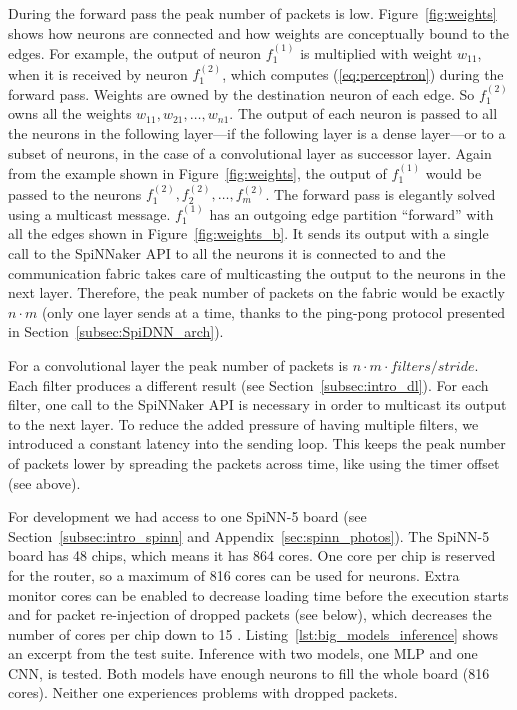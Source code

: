 \documentclass[]{article}
\begin{document}
During the forward pass the peak number of packets is low.
Figure~\ref{fig:weights} shows how neurons are connected and how
weights are conceptually bound to the edges.
For example, the output of neuron $f^{(1)}_1$ is multiplied with
weight $w_{11}$, when it is received by neuron $f^{(2)}_1$,
which computes (\ref{eq:perceptron}) during the forward pass.
Weights are owned by the destination neuron of each edge.
So $f^{(2)}_1$ owns all the weights $w_{11},w_{21},\dots,w_{n1}$.
The output of each neuron is passed to all the neurons in the
following layer---if the following layer is a dense layer---or to a
subset of neurons, in the case of a convolutional layer as successor
layer.
Again from the example shown in Figure~\ref{fig:weights}, the output
of $f^{(1)}_1$ would be passed to the neurons $f^{(2)}_1, f^{(2)}_2,
\dots, f^{(2)}_m$.
The forward pass is elegantly solved using a multicast message.
$f^{(1)}_1$ has an outgoing edge partition ``forward'' with all the
edges shown in Figure~\ref{fig:weights_b}.
It sends its output with a single call to the SpiNNaker API to all
the neurons it is connected to and the communication fabric takes care
of multicasting the output to the neurons in the next layer.
Therefore, the peak number of packets on the fabric would be exactly
$n \cdot m$ (only one layer sends at a time, thanks
to the ping-pong protocol presented in
Section~\ref{subsec:SpiDNN_arch}).

For a convolutional layer the peak number of packets is
$n \cdot m \cdot filters / stride$.
Each filter produces a different result
(see Section~\ref{subsec:intro_dl}).
For each filter, one call to the SpiNNaker API is necessary in order
to multicast its output to the next layer.
To reduce the added pressure of having multiple filters, we introduced
a constant latency into the sending loop.
This keeps the peak number of packets lower by spreading the
packets across time, like using the timer offset (see above).

For development we had access to one SpiNN-5 board
(see Section~\ref{subsec:intro_spinn} and
Appendix~\ref{sec:spinn_photos}).
The SpiNN-5 board has 48 chips, which means it has 864 cores.
One core per chip is reserved for the router, so a maximum of 816
cores can be used for neurons.
Extra monitor cores can be enabled to decrease loading time before the
execution starts and for packet re-injection of dropped packets
(see below), which decreases the number of cores per chip down to 15
\citep{furber_et_al_2020}.
Listing~\ref{lst:big_models_inference} shows an excerpt from the test
suite.
Inference with two models, one MLP and one CNN, is tested.
Both models have enough neurons to fill the whole board (816 cores).
Neither one experiences problems with dropped packets.
\end{document}
